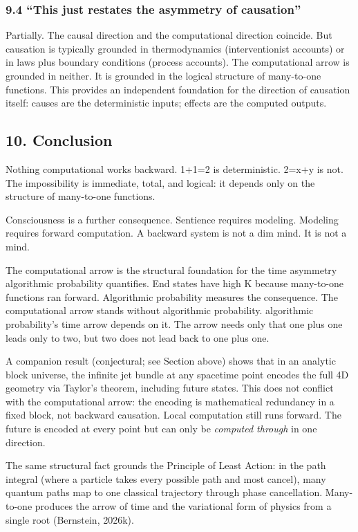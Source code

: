 \documentclass[
]{article}
\begin{document}
\subsubsection{9.4 ``This just restates the asymmetry of
causation''}\label{this-just-restates-the-asymmetry-of-causation}

Partially. The causal direction and the computational direction
coincide. But causation is typically grounded in thermodynamics
(interventionist accounts) or in laws plus boundary conditions (process
accounts). The computational arrow is grounded in neither. It is
grounded in the logical structure of many-to-one functions. This
provides an independent foundation for the direction of causation
itself: causes are the deterministic inputs; effects are the computed
outputs.

\subsection{10. Conclusion}\label{conclusion}

Nothing computational works backward. 1+1=2 is deterministic. 2=x+y is
not. The impossibility is immediate, total, and logical: it depends only
on the structure of many-to-one functions.

Consciousness is a further consequence. Sentience requires modeling.
Modeling requires forward computation. A backward system is not a dim
mind. It is not a mind.

The computational arrow is the structural foundation for the time
asymmetry algorithmic probability quantifies. End states have high K
because many-to-one functions ran forward. Algorithmic probability
measures the consequence. The computational arrow stands without
algorithmic probability. algorithmic probability's time arrow depends on
it. The arrow needs only that one plus one leads only to two, but two
does not lead back to one plus one.

A companion result (conjectural; see Section above) shows that in an
analytic block universe, the infinite jet bundle at any spacetime point
encodes the full 4D geometry via Taylor's theorem, including future
states. This does not conflict with the computational arrow: the
encoding is mathematical redundancy in a fixed block, not backward
causation. Local computation still runs forward. The future is encoded
at every point but can only be \emph{computed through} in one direction.

The same structural fact grounds the Principle of Least Action: in the
path integral (where a particle takes every possible path and most
cancel), many quantum paths map to one classical trajectory through
phase cancellation. Many-to-one produces the arrow of time and the
variational form of physics from a single root (Bernstein, 2026k).
\end{document}
